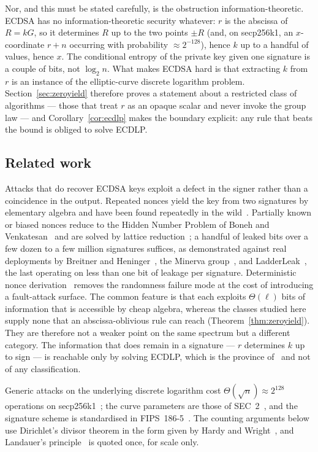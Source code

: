 \documentclass[11pt,a4paper]{article}
\theoremstyle{plain}
\theoremstyle{definition}
\theoremstyle{remark}
\begin{document}
Nor, and this must be stated carefully, is the obstruction information-theoretic. ECDSA has no
information-theoretic security whatever: $r$ is the abscissa of $R = kG$, so it determines $R$ up
to the two points $\pm R$ (and, on secp256k1, an $x$-coordinate $r+n$ occurring with probability
$\approx 2^{-128}$), hence $k$ up to a handful of values, hence $x$. The conditional entropy of
the private key given one signature is a couple of bits, not $\log_2 n$. What makes ECDSA hard is
that extracting $k$ from $r$ is an instance of the elliptic-curve discrete logarithm problem.
Section~\ref{sec:zeroyield} therefore proves a statement about a restricted class of algorithms ---
those that treat $r$ as an opaque scalar and never invoke the group law --- and
Corollary~\ref{cor:ecdlp} makes the boundary explicit: any rule that beats the bound is obliged to
solve ECDLP.

\subsection{Related work}

Attacks that do recover ECDSA keys exploit a defect in the signer rather than a coincidence in the
output. Repeated nonces yield the key from two signatures by elementary algebra and have been
found repeatedly in the wild~\cite{bos2014,breitner2019}. Partially known or biased nonces reduce
to the Hidden Number Problem of Boneh and Venkatesan~\cite{boneh1996} and are solved by lattice
reduction~\cite{hgs2001,ns2002,ns2003}; a handful of leaked bits over a few dozen to a few million
signatures suffices, as demonstrated against real deployments by Breitner and
Heninger~\cite{breitner2019}, the Minerva group~\cite{minerva2020}, and
LadderLeak~\cite{ladderleak2020}, the last operating on less than one bit of leakage per
signature. Deterministic nonce derivation~\cite{rfc6979} removes the randomness failure mode at
the cost of introducing a fault-attack surface. The common feature is that each exploits
$\Theta(\ell)$ bits of information that is accessible by cheap algebra, whereas the classes studied
here supply none that an abscissa-oblivious rule can reach (Theorem~\ref{thm:zeroyield}). They
are therefore not a weaker point on the same spectrum but a different category. The information
that does remain in a signature --- $r$ determines $k$ up to sign --- is reachable only by solving
ECDLP, which is the province of~\cite{pollard1978} and not of any classification.

Generic attacks on the underlying discrete logarithm cost $\Theta(\sqrt{n}) \approx 2^{128}$
operations on secp256k1~\cite{pollard1978}; the curve parameters are those of SEC~2~\cite{sec2},
and the signature scheme is standardised in FIPS~186-5~\cite{fips1865}. The counting arguments
below use Dirichlet's divisor theorem in the form given by Hardy and Wright~\cite{hardywright},
and Landauer's principle~\cite{landauer1961} is quoted once, for scale only.
\end{document}
